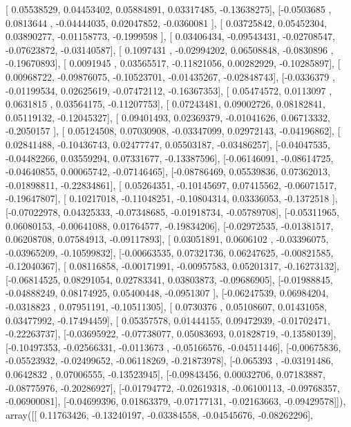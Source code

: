 \documentclass{article}
\begin{document}
       [ 0.05538529,  0.04453402,  0.05884891,  0.03317485, -0.13638275],
       [-0.0503685 ,  0.0813644 , -0.04444035,  0.02047852, -0.0360081 ],
       [ 0.03725842,  0.05452304,  0.03890277, -0.01158773, -0.1999598 ],
       [ 0.03406434, -0.09543431, -0.02708547, -0.07623872, -0.03140587],
       [ 0.1097431 , -0.02994202,  0.06508848, -0.0830896 , -0.19670893],
       [ 0.0091945 ,  0.03565517, -0.11821056,  0.00282929, -0.10285897],
       [ 0.00968722, -0.09876075, -0.10523701, -0.01435267, -0.02848743],
       [-0.0336379 , -0.01199534,  0.02625619, -0.07472112, -0.16367353],
       [ 0.05474572,  0.0113097 ,  0.0631815 ,  0.03564175, -0.11207753],
       [ 0.07243481,  0.09002726,  0.08182841,  0.05119132, -0.12045327],
       [ 0.09401493,  0.02369379, -0.01041626,  0.06713332, -0.2050157 ],
       [ 0.05124508,  0.07030908, -0.03347099,  0.02972143, -0.04196862],
       [ 0.02841488, -0.10436743,  0.02477747,  0.05503187, -0.03486257],
       [-0.04047535, -0.04482266,  0.03559294,  0.07331677, -0.13387596],
       [-0.06146091, -0.08614725, -0.04640855,  0.00065742, -0.07146465],
       [-0.08786469,  0.05539836,  0.07362013, -0.01898811, -0.22834861],
       [ 0.05264351, -0.10145697,  0.07415562, -0.06071517, -0.19647807],
       [ 0.10217018, -0.11048251, -0.10804314,  0.03336053, -0.1372518 ],
       [-0.07022978,  0.04325333, -0.07348685, -0.01918734, -0.05789708],
       [-0.05311965,  0.06080153, -0.00641088,  0.01764577, -0.19834206],
       [-0.02972535, -0.01381517,  0.06208708,  0.07584913, -0.09117893],
       [ 0.03051891,  0.0606102 , -0.03396075, -0.03965209, -0.10599832],
       [-0.00663535,  0.07321736,  0.06247625, -0.00821585, -0.12040367],
       [ 0.08116858, -0.00171991, -0.00957583,  0.05201317, -0.16273132],
       [-0.06814525,  0.08291054,  0.02783341,  0.03803873, -0.09686905],
       [-0.01988845, -0.04888249,  0.08174925,  0.05400448, -0.0951307 ],
       [-0.06247539,  0.06984204, -0.0318823 ,  0.07951191, -0.10511305],
       [ 0.0730376 ,  0.05108607,  0.01431058,  0.03477992, -0.17494459],
       [ 0.05357578,  0.01444155,  0.09472939, -0.01702471, -0.22263737],
       [-0.03695922, -0.07738077,  0.05083693,  0.01828719, -0.13580139],
       [-0.10497353, -0.02566331, -0.0113673 , -0.05166576, -0.04511446],
       [-0.00675836, -0.05523932, -0.02499652, -0.06118269, -0.21873978],
       [-0.065393  , -0.03191486,  0.0642832 ,  0.07006555, -0.13523945],
       [-0.09843456,  0.00032706,  0.07183887, -0.08775976, -0.20286927],
       [-0.01794772, -0.02619318, -0.06100113, -0.09768357, -0.06900081],
       [-0.04699396,  0.01863379, -0.07177131, -0.02163663, -0.09429578]]), array([[ 0.11763426, -0.13240197, -0.03384558, -0.04545676, -0.08262296],
\end{document}
